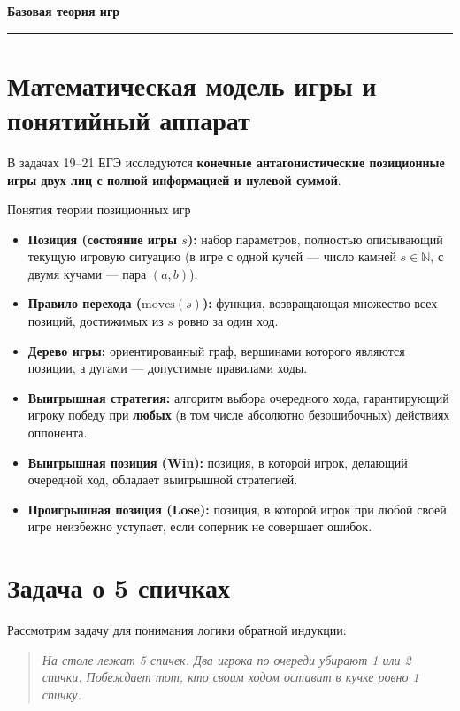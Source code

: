 \documentclass[11pt,a4paper]{article}
\begin{document}
\begin{center}
    {\LARGE \textbf{Базовая теория игр}}\\[0.2cm]
    \rule{\textwidth}{1pt}
\end{center}

\section{Математическая модель игры и понятийный аппарат}

В задачах 19--21 ЕГЭ исследуются \textbf{конечные антагонистические позиционные игры двух лиц с полной информацией и нулевой суммой}.

\begin{definitionbox}{Понятия теории позиционных игр}
\begin{itemize}
    \item \textbf{Позиция (состояние игры $s$):} набор параметров, полностью описывающий текущую игровую ситуацию (в игре с одной кучей --- число камней $s \in \mathbb{N}$, с двумя кучами --- пара $(a, b)$).
    \item \textbf{Правило перехода ($\text{moves}(s)$):} функция, возвращающая множество всех позиций, достижимых из $s$ ровно за один ход.
    \item \textbf{Дерево игры:} ориентированный граф, вершинами которого являются позиции, а дугами --- допустимые правилами ходы.
    \item \textbf{Выигрышная стратегия:} алгоритм выбора очередного хода, гарантирующий игроку победу при \textbf{любых} (в том числе абсолютно безошибочных) действиях оппонента.
    \item \textbf{Выигрышная позиция (Win):} позиция, в которой игрок, делающий очередной ход, обладает выигрышной стратегией.
    \item \textbf{Проигрышная позиция (Lose):} позиция, в которой игрок при любой своей игре неизбежно уступает, если соперник не совершает ошибок.
\end{itemize}
\end{definitionbox}

\section{Задача о 5 спичках}

Рассмотрим задачу для понимания логики обратной индукции:
\begin{quote}
\textit{На столе лежат 5 спичек. Два игрока по очереди убирают 1 или 2 спички. Побеждает тот, кто своим ходом оставит в кучке ровно 1 спичку.}
\end{quote}
\end{document}
